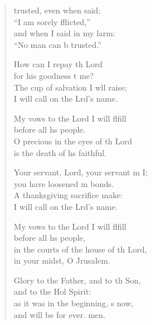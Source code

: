 \begin{verse}
  \begin{patverse}
     trusted, even when  said: \Med\\
    “I am sorely fflicted,”\\
    and when I said in my larm: \Med\\
    “No man can b trusted.”
    
    How can I repay th Lord \Med\\
    for his goodness t me?\\
    The cup of salvation I w\pointup{\i}ll raise; \Med\\
    I will call on the Lrd’s name.
    
    My vows to the Lord I will flfill \Med\\
    before all h\pointup{\i}s people.\\
    O precious in the eyes of th Lord \Med\\
    is the death of h\pointup{\i}s faithful.

    Your servant, Lord, your servant m I; \Med\\
    you have loosened m bonds.\\
    A thanksgiving sacrifice  make: \Med\\
    I will call on the Lrd’s name.

    My vows to the Lord I will flfill \Med\\
    before all h\pointup{\i}s people,\\
    in the courts of the house of th Lord, \Med\\
    in your midst, O Jrusalem.

    Glory to the Father, and to th Son, \Med\\
    and to the Hol Spirit:\\
    as it was in the beginning, \pointup{\i}s now, \Med\\
    and will be for ever. men.
  \end{patverse}
\end{verse}
